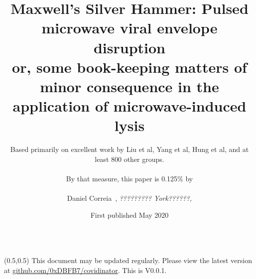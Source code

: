 \documentclass[paper.tex]{subfiles}
\begin{document}


\title{Maxwell's Silver Hammer: Pulsed microwave viral envelope disruption\footnotemark\\or, some book-keeping matters of minor consequence in the application of microwave-induced lysis}
\date{First published May 2020}
\author{Based primarily on excellent work by Liu et al, Yang et al, Hung et al, and at least 800 other groups.\\
	\\
		By that measure, this paper is 0.125\% by \\
		\\
		\small{{Daniel Correia}\ , \textit{????????? York??????,}\footnotemark}}



\flushbottom 
\maketitle
\thispagestyle{empty}


\null\begin{tabular}[t]{l@{}}
	  \\
	
\end{tabular}


\begin{textblock}{10}(0.5,0.5)
\noindent This document may be updated regularly. Please view the latest version at \href{https://www.github.com/0xDBFB7/covidinator}{github.com/0xDBFB7/covidinator}. This is V0.0.1.
\end{textblock}
\end{document}
